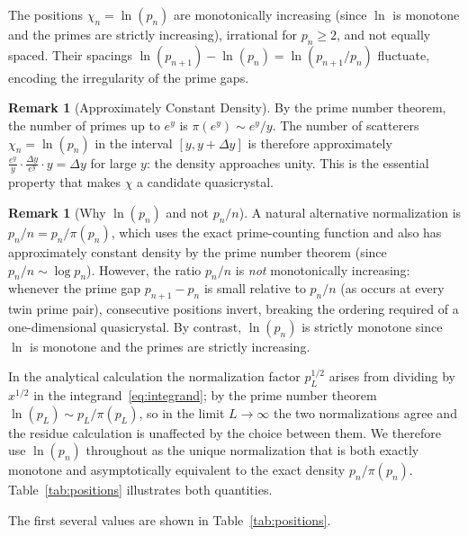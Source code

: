 \documentclass[11pt, oneside]{article}
\theoremstyle{definition}
\newtheorem{remark}[theorem]{Remark}
\begin{document}
The positions $\chi_n = \ln(p_n)$ are monotonically increasing
(since $\ln$ is monotone and the primes are strictly increasing),
irrational for $p_n \geq 2$, and not equally spaced.
Their spacings $\ln(p_{n+1}) - \ln(p_n) = \ln(p_{n+1}/p_n)$
fluctuate, encoding the irregularity of the prime gaps.

\begin{remark}[Approximately Constant Density]
By the prime number theorem, the number of primes up to $e^y$ is
$\pi(e^y) \sim e^y/y$. The number of scatterers
$\chi_n = \ln(p_n)$ in the interval $[y, y+\Delta y]$ is therefore
approximately $\frac{e^y}{y}\cdot\frac{\Delta y}{e^y}\cdot y
= \Delta y$ for large $y$: the density approaches unity.
This is the essential property that makes $\chi$ a candidate
quasicrystal.
\end{remark}

\begin{remark}[Why $\ln(p_n)$ and not $p_n/n$]
\label{rem:monotonicity}
A natural alternative normalization is $p_n/n = p_n/\pi(p_n)$,
which uses the exact prime-counting function and also has
approximately constant density by the prime number theorem
(since $p_n/n \sim \log p_n$). However, the ratio $p_n/n$
is \emph{not} monotonically increasing: whenever the prime gap
$p_{n+1} - p_n$ is small relative to $p_n/n$ (as occurs at every
twin prime pair), consecutive positions invert, breaking the
ordering required of a one-dimensional quasicrystal.
By contrast, $\ln(p_n)$ is strictly monotone since $\ln$ is
monotone and the primes are strictly increasing.

In the analytical calculation the normalization factor
$p_L^{1/2}$ arises from dividing by $x^{1/2}$ in the
integrand~\eqref{eq:integrand}; by the prime number theorem
$\ln(p_L) \sim p_L/\pi(p_L)$, so in the limit $L\to\infty$
the two normalizations agree and the residue
calculation is unaffected by the choice between them.
We therefore use $\ln(p_n)$ throughout as the unique
normalization that is both exactly monotone and asymptotically
equivalent to the exact density $p_n/\pi(p_n)$.
Table~\ref{tab:positions} illustrates both quantities.
\end{remark}

The first several values are shown in Table~\ref{tab:positions}.
\end{document}
